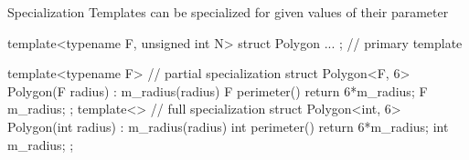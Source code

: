 \begin{frame}[fragile]
  \begin{block}{Specialization}
    Templates can be specialized for given values of their parameter
  \end{block}
  \small
  \begin{cppcode*}{}
    template<typename F, unsigned int N>
    struct Polygon { ... }; // primary template

    template<typename F> // partial specialization
    struct Polygon<F, 6> {
      Polygon(F radius) : m_radius(radius) {}
      F perimeter() { return 6*m_radius; }
      F m_radius;
    };
    template<>           // full specialization
    struct Polygon<int, 6> {
      Polygon(int radius) : m_radius(radius) {}
      int perimeter() { return 6*m_radius; }
      int m_radius;
    };
  \end{cppcode*}
\end{frame}

